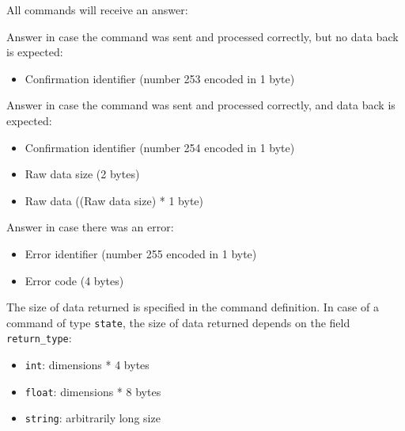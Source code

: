 \documentclass[12pt,a4paper]{report}
\begin{document}
All commands will receive an answer:

Answer in case the command was sent and processed correctly, but no data back is expected:
\begin{itemize}
\item Confirmation identifier (number 253 encoded in 1 byte)
\end{itemize}

Answer in case the command was sent and processed correctly, and data back is expected:
\begin{itemize}
\item Confirmation identifier (number 254 encoded in 1 byte)
\item Raw data size (2 bytes)
\item Raw data ((Raw data size) * 1 byte)
\end{itemize}

Answer in case there was an error:
\begin{itemize}
\item Error identifier (number 255 encoded in 1 byte)
\item Error code (4 bytes)
\end{itemize}

The size of data returned is specified in the command definition. In case of a command of type \texttt{state}, the size of data returned depends on the field \texttt{return\_type}:
\begin{itemize}
\item \texttt{int}: dimensions * 4 bytes
\item \texttt{float}: dimensions * 8 bytes
\item \texttt{string}: arbitrarily long size
\end{itemize}
\end{document}

